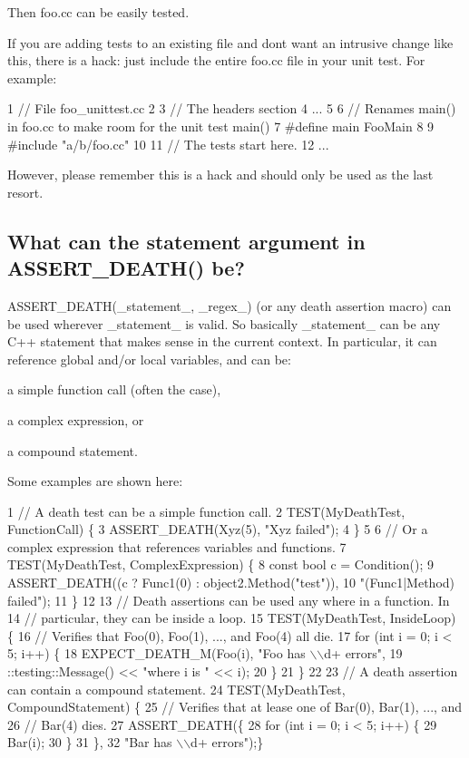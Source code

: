Then {\ttfamily foo.\+cc} can be easily tested.

If you are adding tests to an existing file and don\textquotesingle{}t want an intrusive change like this, there is a hack\+: just include the entire {\ttfamily foo.\+cc} file in your unit test. For example\+: 
\begin{DoxyCode}
1 // File foo\_unittest.cc
2 
3 // The headers section
4 ...
5 
6 // Renames main() in foo.cc to make room for the unit test main()
7 #define main FooMain
8 
9 #include "a/b/foo.cc"
10 
11 // The tests start here.
12 ...
\end{DoxyCode}


However, please remember this is a hack and should only be used as the last resort.

\subsection*{What can the statement argument in A\+S\+S\+E\+R\+T\+\_\+\+D\+E\+A\+T\+H() be?}

{\ttfamily A\+S\+S\+E\+R\+T\+\_\+\+D\+E\+A\+T\+H(\+\_\+statement\+\_\+, \+\_\+regex\+\_\+)} (or any death assertion macro) can be used wherever {\ttfamily \+\_\+statement\+\_\+} is valid. So basically {\ttfamily \+\_\+statement\+\_\+} can be any C++ statement that makes sense in the current context. In particular, it can reference global and/or local variables, and can be\+:
\begin{DoxyItemize}
\item a simple function call (often the case),
\item a complex expression, or
\item a compound statement.
\end{DoxyItemize}

Some examples are shown here\+:


\begin{DoxyCode}
1 // A death test can be a simple function call.
2 TEST(MyDeathTest, FunctionCall) \{
3   ASSERT\_DEATH(Xyz(5), "Xyz failed");
4 \}
5 
6 // Or a complex expression that references variables and functions.
7 TEST(MyDeathTest, ComplexExpression) \{
8   const bool c = Condition();
9   ASSERT\_DEATH((c ? Func1(0) : object2.Method("test")),
10                "(Func1|Method) failed");
11 \}
12 
13 // Death assertions can be used any where in a function. In
14 // particular, they can be inside a loop.
15 TEST(MyDeathTest, InsideLoop) \{
16   // Verifies that Foo(0), Foo(1), ..., and Foo(4) all die.
17   for (int i = 0; i < 5; i++) \{
18     EXPECT\_DEATH\_M(Foo(i), "Foo has \(\backslash\)\(\backslash\)d+ errors",
19                    ::testing::Message() << "where i is " << i);
20   \}
21 \}
22 
23 // A death assertion can contain a compound statement.
24 TEST(MyDeathTest, CompoundStatement) \{
25   // Verifies that at lease one of Bar(0), Bar(1), ..., and
26   // Bar(4) dies.
27   ASSERT\_DEATH(\{
28     for (int i = 0; i < 5; i++) \{
29       Bar(i);
30     \}
31   \},
32   "Bar has \(\backslash\)\(\backslash\)d+ errors");\}
\end{DoxyCode}


